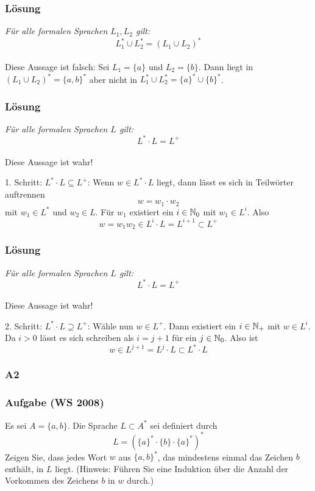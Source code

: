 \begin{frame}
	\frametitle{Lösung}
	\textit{Für alle formalen Sprachen $L_1 , L_2$ gilt: 
		$$L_1^\ast \cup L_2^\ast = (L_1 \cup L_2 )^\ast$$ } \\[2em] \pause
	Diese Aussage ist falsch: Sei $L_1 = \{a\}$ und $L_2 = \{b\}$. Dann liegt  in $(L_1 \cup L_2 )^\ast = \{a, b\}^\ast$ aber nicht in $L_1^\ast \cup L_2^\ast = \{a\}^\ast \cup \{b\}^\ast$.
\end{frame}

\begin{frame}
	\frametitle{Lösung}
	\textit{Für alle formalen Sprachen $L$ gilt: 
		$$L^\ast \cdot L = L^+ $$ } \\[1em] \pause
	Diese Aussage ist wahr! 
	\begin{block}{1. Schritt: $L^\ast \cdot L \subseteq L^+$:} \pause
	Wenn $w \in L^\ast \cdot L$ liegt, dann lässt es sich in Teilwörter auftrennen $$ w = w_1 \cdot w_2$$ mit $w_1 \in L^\ast$ und $w_2 \in L$. Für $w_1$ existiert ein $i \in \mathbb{N}_0$ mit $w_1 \in L^i$. Also $$w = w_1 w_2 \in L^i \cdot L = L^{i+1} \subset L^+$$
	\end{block}
\end{frame}

\begin{frame}
	\frametitle{Lösung}
	\textit{Für alle formalen Sprachen $L$ gilt: 
		$$L^\ast \cdot L = L^+ $$ } \\[1em] 
	Diese Aussage ist wahr! 
	\begin{block}{2. Schritt: $L^\ast \cdot L \supseteq L^+$:} \pause
	Wähle nun $w \in L^+$. Dann existiert ein $i \in \mathbb{N}_+$ mit $w \in L^i$. Da $i > 0$ lässt es sich schreiben als $i = j + 1$ für ein $j \in \mathbb{N}_0$. Also ist $$w \in L^{j+1} = L^j \cdot L \subset L^\ast \cdot L$$
	\end{block}
\end{frame}

\subsubsection{A2}
\begin{frame}
	\frametitle{Aufgabe (WS 2008) }
	Es sei $A = \{a, b\}$. Die Sprache $L \subset A^\ast$ sei definiert durch $$L = (\{a\}^\ast \cdot \{b\} \cdot \{a\}^\ast)^\ast$$
	Zeigen Sie, dass jedes Wort $w$ aus $\{a, b\}^\ast$, das mindestens einmal das Zeichen
	$b$ enthält, in $L$ liegt. (Hinweis: Führen Sie eine Induktion über die Anzahl der
	Vorkommen des Zeichens $b$ in $w$ durch.)
\end{frame}

